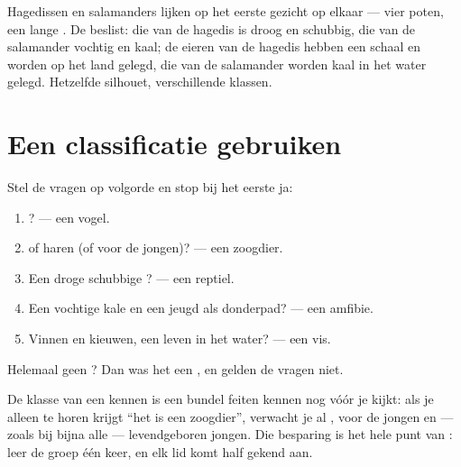 \begin{remark}\label{rem:g4:classifying-animals:confusion}
Hagedissen en salamanders lijken op het eerste gezicht op elkaar ---
vier poten, een lange . De  beslist: die van de hagedis is
droog en schubbig, die van de salamander vochtig en kaal; de eieren van
de hagedis hebben een schaal en worden op het land gelegd, die van de
salamander worden kaal in het water gelegd. Hetzelfde silhouet,
verschillende klassen.
\end{remark}

\section{Een classificatie gebruiken}

\begin{method}\label{met:g4:classifying-animals:place}
Stel de vragen op volgorde en stop bij het eerste ja:
\begin{enumerate}
  \item {}? --- een vogel.
  \item {} of haren (of  voor de jongen)? --- een zoogdier.
  \item Een droge schubbige ? --- een reptiel.
  \item Een vochtige kale  en een jeugd als donderpad? --- een amfibie.
  \item Vinnen en kieuwen, een leven in het water? --- een vis.
\end{enumerate}
Helemaal geen ? Dan was het een , en gelden
de vragen niet.
\end{method}

\begin{proposition}\label{prop:g4:classifying-animals:free}
De klasse van een  kennen is een bundel feiten kennen nog vóór je
kijkt: als je alleen te horen krijgt ``het is een zoogdier'', verwacht
je al ,  voor de jongen en --- zoals bij bijna alle 
--- levendgeboren jongen. Die besparing is het hele punt van
: leer de groep één keer, en elk lid komt half gekend aan.
\end{proposition}
\admitted

